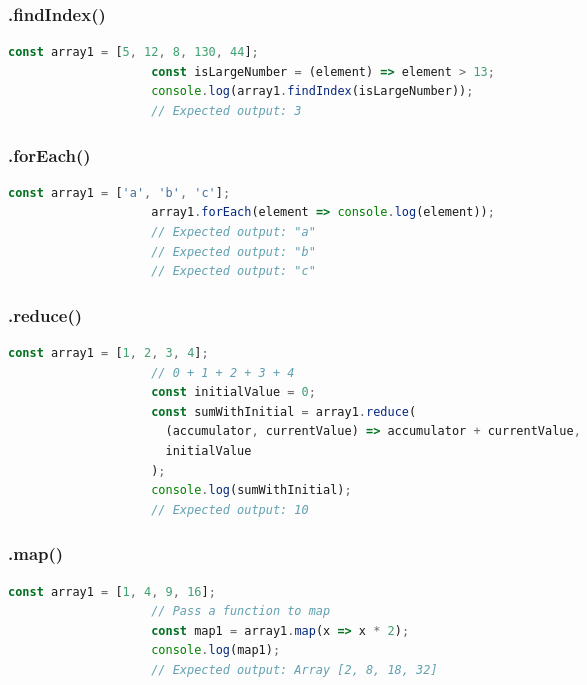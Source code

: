 \documentclass[a4paper, landscape, 8pt]{scrartcl}
\begin{document}
\begin{multicols*}{4}
        \subsubsection{.findIndex()}
        \begin{lstlisting}[language=JavaScript]
                    const array1 = [5, 12, 8, 130, 44];
                    const isLargeNumber = (element) => element > 13;
                    console.log(array1.findIndex(isLargeNumber));
                    // Expected output: 3
        \end{lstlisting}

        \subsubsection{.forEach()}
        \begin{lstlisting}[language=JavaScript]
                    const array1 = ['a', 'b', 'c'];
                    array1.forEach(element => console.log(element));
                    // Expected output: "a"
                    // Expected output: "b"
                    // Expected output: "c"
        \end{lstlisting}

        \subsubsection{.reduce()}
        \begin{lstlisting}[language=JavaScript]
                    const array1 = [1, 2, 3, 4];
                    // 0 + 1 + 2 + 3 + 4
                    const initialValue = 0;
                    const sumWithInitial = array1.reduce(
                      (accumulator, currentValue) => accumulator + currentValue,
                      initialValue
                    );
                    console.log(sumWithInitial);
                    // Expected output: 10
        \end{lstlisting}

        \subsubsection{.map()}
        \begin{lstlisting}[language=JavaScript]
                    const array1 = [1, 4, 9, 16];
                    // Pass a function to map
                    const map1 = array1.map(x => x * 2);
                    console.log(map1);
                    // Expected output: Array [2, 8, 18, 32]
        \end{lstlisting}


\end{multicols*}
\end{document}
